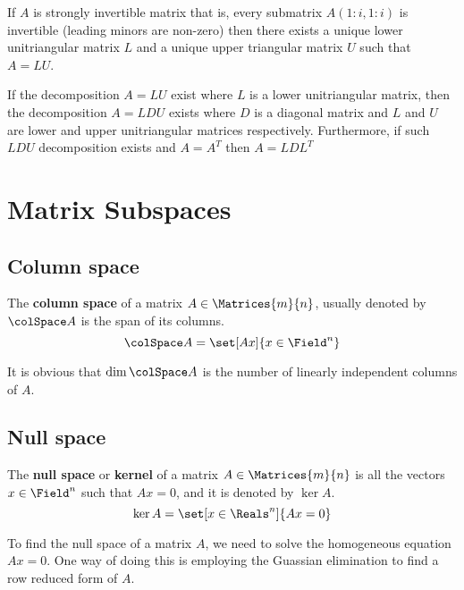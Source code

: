 \begin{theorem}
    If \(A\) is strongly invertible matrix that is, every submatrix \(A(1:i,1:i)\)
    is invertible (leading minors are non-zero) then there exists a unique lower unitriangular matrix \(L\) and a unique upper triangular matrix \(U\) such that \(A = LU\).
\end{theorem}

\begin{theorem}
    If the decomposition \(A = LU\) exist where \(L\) is a lower unitriangular matrix, then the decomposition \(A = LDU\) exists where \(D\) is a diagonal matrix and \(L\) and \( U\) are lower and upper unitriangular matrices respectively. Furthermore, if such \(LDU\) decomposition exists and \(A = A^T\) then \(A = LDL^T\)
\end{theorem}

\section{Matrix Subspaces}
\subsection{Column space}
The \textbf{column space} of a matrix \(A \in \Matrices{m}{n}\), usually denoted by \(\colSpace A\) is the span of its columns.
\begin{equation*}
    \colSpace A = \set[Ax]{x \in \Field^n}
\end{equation*}

It is obvious that \(\dim \colSpace A\) is the number of linearly independent columns of \(A\).
\subsection{Null space}
The \textbf{null space} or \textbf{kernel} of a matrix \(A \in \Matrices{m}{n}\) is all the vectors \(x \in \Field^n\) such that \(Ax = 0\), and it is denoted by \(\ker A\).
\begin{equation*}
    \ker A = \set[x \in \Reals^n]{Ax = 0}
\end{equation*}

To find the null space of a matrix \(A\), we need to solve the homogeneous equation \(Ax = 0\). One way of doing this is employing the Guassian elimination to find a row reduced form of \(A\).

